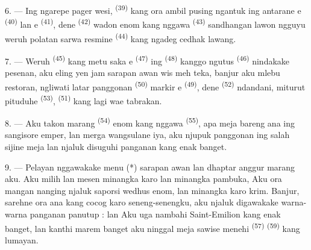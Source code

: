 \VUsaut{4.0mm}
\VUsaut{3.0mm}

6. --- Ing ngarepe pager wesi, 
\textsuperscript{(39)} kang ora ambil pusing ngantuk ing antarane
e \textsuperscript{(40)} lan e \textsuperscript{(41)}, dene 
\textsuperscript{(42)} wadon enom kang nggawa 
\textsuperscript{(43)} sandhangan lawon ngguyu weruh polatan sarwa
resmine  \textsuperscript{(44)} kang ngadeg cedhak
lawang.

7. --- Weruh  \textsuperscript{(45)} kang metu saka
e \textsuperscript{(47)} ing 
\textsuperscript{(48)} kanggo ngutus 
\textsuperscript{(46)} nindakake pesenan, aku eling yen jam sarapan awan
wis meh teka, banjur aku mlebu restoran, ngliwati latar panggonan
 \textsuperscript{(50)} markir e
\textsuperscript{(49)}, dene  \textsuperscript{(52)}
ndandani, miturut pituduhe  \textsuperscript{(53)},
 \textsuperscript{(51)} kang lagi wae
tabrakan.

8. --- Aku takon marang  \textsuperscript{(54)} enom
kang nggawa  \textsuperscript{(55)}, apa meja bareng ana
ing sangisore emper, lan merga wangsulane iya, aku njupuk panggonan ing
salah sijine meja lan njaluk disuguhi panganan kang enak banget.

\textit{}

\VUsaut{4.0mm}
\VUsaut{3.0mm}

9. --- Pelayan nggawakake menu (*) sarapan awan lan dhaptar anggur
marang aku. Aku milih lan mesen minangka 
karo  lan minangka pambuka, 
Aku ora mangan  nanging njaluk saporsi 
wedhus enom, lan minangka  karo krim.
Banjur, sarehne ora ana  kang cocog karo
seneng-senengku, aku njaluk digawakake warna-warna panganan panutup :
  lan  Aku uga nambahi
 Saint-Emilion kang enak banget, lan kanthi marem
banget aku ninggal meja sawise menehi 
\textsuperscript{(57)}  \textsuperscript{(59)} kang lumayan.

